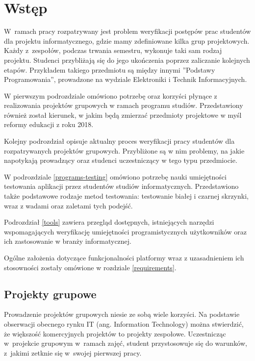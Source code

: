 \chapter{Wstęp}
\label{chapter:intro}

W~ramach pracy rozpatrywany jest problem weryfikacji postępów prac studentów dla projektu informatycznego, gdzie mamy zdefiniowane kilka grup projektowych.
Każdy z~zespołów, podczas trwania semestru, wykonuje taki sam rodzaj projektu.
Studenci przybliżają się do jego ukończenia poprzez zaliczanie kolejnych etapów.
Przykładem takiego przedmiotu są między innymi ”Podstawy Programowania”, prowadzone na wydziale Elektroniki i Technik Informacyjnych.

W pierwszym podrozdziale omówiono potrzebę oraz korzyści płynące z realizowania projektów grupowych w ramach programu studiów. 
Przedstawiony również został kierunek, w jakim będą zmierzać przedmioty projektowe w myśl reformy edukacji z roku 2018.

Kolejny podrozdział opisuje aktualny proces weryfikacji pracy studentów dla rozpatrywanych projektów grupowych.
Przybliżone są w nim problemy, na jakie napotykają prowadzący oraz studenci uczestniczący w tego typu przedmiocie.

W podrozdziale \ref{programs-testing} omówiono potrzebę nauki umiejętności testowania aplikacji przez studentów studiów informatycznych.
Przedstawiono także podstawowe rodzaje metod testowania: testowanie białej i czarnej skrzynki, wraz z wadami oraz zaletami tych podejść.

Podrozdział \ref{tools} zawiera przegląd dostępnych, istniejących narzędzi wspomagających weryfikację umiejętności programistycznych użytkowników oraz ich zastosowanie w branży informatycznej.

Ogólne założenia dotyczące funkcjonalności platformy wraz z uzasadnieniem ich stosowności zostały omówione w rozdziale \ref{requirements}.

\vfill

\section{Projekty grupowe}

Prowadzenie projektów grupowych niesie ze sobą wiele korzyści.
Na podstawie obserwacji obecnego rynku IT (ang. Information Technology) można stwierdzić, że większość komercyjnych projektów to projekty zespołowe.
Uczestnicząc w~projekcie grupowym w~ramach zajęć, student przystosowuje się do warunków, z~jakimi zetknie się w~swojej pierwszej pracy.


